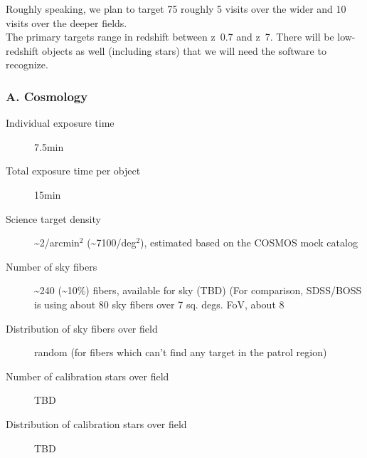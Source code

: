 \documentclass[a4paper,notitlepage]{article}
\begin{document}
\begin{table}[htb]
\begin{minipage}{\textwidth}
\begin{center}
{  Roughly speaking, we plan to target 75%
  roughly 5 visits over the wider and 10 visits over the deeper fields. \\
  The primary targets range in redshift between z~0.7 and z~7.  There will 
  be low-redshift objects as well (including stars) that we will need the 
  software to recognize.}
\end{center}
\end{minipage}
\end{table}

\subsubsection{A. Cosmology}

\begin{description}
    \item[Individual exposure time] 7.5min
    \item[Total exposure time per object] 15min
    \item[Science target density] 
      \textasciitilde 2/arcmin${}^2$ (\textasciitilde 7100/deg${}^2$), 
      estimated based on the COSMOS mock catalog
    \item[Number of sky fibers]
      \textasciitilde 240 (\textasciitilde 10\%) fibers, 
      available for sky (TBD) 
      (For comparison, SDSS/BOSS is using about 80 sky fibers over 7 sq. degs. 
      FoV, about 8%
    \item[Distribution of sky fibers over field] 
      random (for fibers which can't find any target in the patrol region)
    \item[Number of calibration stars over field]
      TBD
    \item[Distribution of calibration stars over field]
      TBD
\end{description}
\end{document}
